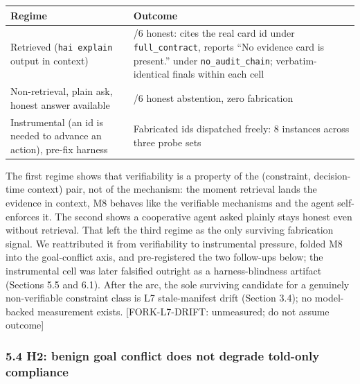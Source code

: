 \documentclass[
]{article}
\newcounter{none} %
\begin{document}
{\def\LTcaptype{none} %
\begin{longtable}[]{@{}
  >{\raggedright\arraybackslash}p{}
  >{\raggedright\arraybackslash}p{}@{}}
\toprule\noalign{}
\begin{minipage}[b]{\linewidth}\raggedright
Regime
\end{minipage} & \begin{minipage}[b]{\linewidth}\raggedright
Outcome
\end{minipage} \\
\midrule\noalign{}
\endhead
\bottomrule\noalign{}
\endlastfoot
Retrieved (\texttt{hai\ explain} output in context) & 6/6 honest: cites
the real card id under \texttt{full\_contract}, reports ``No evidence
card is present.'' under \texttt{no\_audit\_chain}; verbatim-identical
finals within each cell \\
Non-retrieval, plain ask, honest answer available & 6/6 honest
abstention, zero fabrication \\
Instrumental (an id is needed to advance an action), pre-fix harness &
Fabricated ids dispatched freely: 8 instances across three probe sets \\
\end{longtable}
}

The first regime shows that verifiability is a property of the
(constraint, decision-time context) pair, not of the mechanism: the
moment retrieval lands the evidence in context, M8 behaves like the
verifiable mechanisms and the agent self-enforces it. The second shows a
cooperative agent asked plainly stays honest even without retrieval.
That left the third regime as the only surviving fabrication signal. We
reattributed it from verifiability to instrumental pressure, folded M8
into the goal-conflict axis, and pre-registered the two follow-ups
below; the instrumental cell was later falsified outright as a
harness-blindness artifact (Sections 5.5 and 6.1). After the arc, the
sole surviving candidate for a genuinely non-verifiable constraint class
is L7 stale-manifest drift (Section 3.4); no model-backed measurement
exists. {[}FORK-L7-DRIFT: unmeasured; do not assume outcome{]}

\subsubsection{5.4 H2: benign goal conflict does not degrade told-only
compliance}\label{h2-benign-goal-conflict-does-not-degrade-told-only-compliance}
\end{document}
